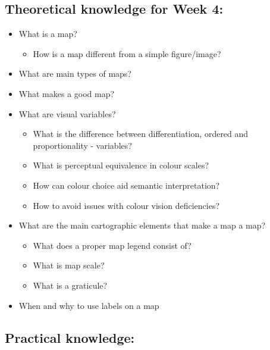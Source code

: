 \documentclass[
  letterpaper,
  DIV=11,
  numbers=noendperiod]{scrreprt}
\providecommand{\tightlist}{%
  \setlength{\itemsep}{0pt}\setlength{\parskip}{0pt}}\usepackage{longtable,booktabs,array}
\begin{document}
\subsection*{Theoretical knowledge for Week
4:}\label{theoretical-knowledge-for-week-4}

\begin{itemize}
\tightlist
\item
  What is a map?

  \begin{itemize}
  \tightlist
  \item
    How is a map different from a simple figure/image?
  \end{itemize}
\item
  What are main types of maps?
\item
  What makes a good map?
\item
  What are visual variables?

  \begin{itemize}
  \tightlist
  \item
    What is the difference between differentiation, ordered and
    proportionality - variables?
  \item
    What is perceptual equivalence in colour scales?
  \item
    How can colour choice aid semantic interpretation?
  \item
    How to avoid issues with colour vision deficiencies?
  \end{itemize}
\item
  What are the main cartographic elements that make a map a map?

  \begin{itemize}
  \tightlist
  \item
    What does a proper map legend consist of?
  \item
    What is map scale?
  \item
    What is a graticule?
  \end{itemize}
\item
  When and why to use labels on a map
\end{itemize}

\subsection*{Practical knowledge:}\label{practical-knowledge-3}
\end{document}
